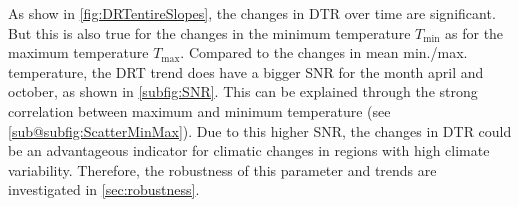 As show in \cref{fig:DRTentireSlopes}, the changes in DTR over time are significant. But this is also true for the changes in the minimum temperature $T_{\mathrm{min}}$ as for the maximum temperature $T_{\mathrm{max}}$.
Compared to the changes in mean min./max. temperature, the DRT trend does have a bigger SNR for the month april and october, as shown in \cref{subfig:SNR}. This can be explained through the strong correlation between maximum and 
minimum temperature (see \cref{sub@subfig:ScatterMinMax}). Due to this higher SNR, the changes in DTR could be an advantageous indicator for climatic changes in regions with high 
climate variability. Therefore, the robustness of this parameter and trends are investigated in \cref{sec:robustness}.

